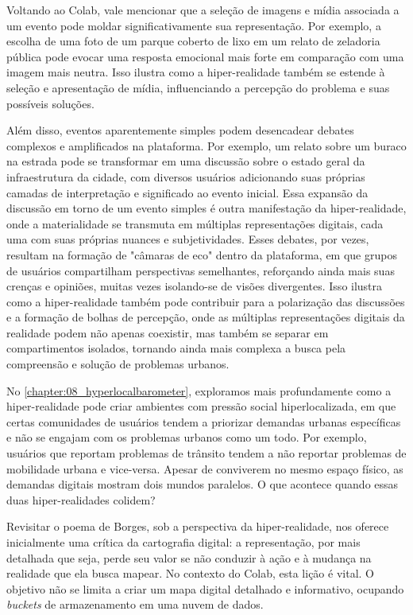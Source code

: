 Voltando ao Colab, vale mencionar que a seleção de imagens e mídia associada a um evento pode moldar significativamente sua representação. Por exemplo, a escolha de uma foto de um parque coberto de lixo em um relato de zeladoria pública pode evocar uma resposta emocional mais forte em comparação com uma imagem mais neutra. Isso ilustra como a hiper-realidade também se estende à seleção e apresentação de mídia, influenciando a percepção do problema e suas possíveis soluções.

Além disso, eventos aparentemente simples podem desencadear debates complexos e amplificados na plataforma. Por exemplo, um relato sobre um buraco na estrada pode se transformar em uma discussão sobre o estado geral da infraestrutura da cidade, com diversos usuários adicionando suas próprias camadas de interpretação e significado ao evento inicial. Essa expansão da discussão em torno de um evento simples é outra manifestação da hiper-realidade, onde a materialidade se transmuta em múltiplas representações digitais, cada uma com suas próprias nuances e subjetividades. Esses debates, por vezes, resultam na formação de "câmaras de eco" dentro da plataforma, em que grupos de usuários compartilham perspectivas semelhantes, reforçando ainda mais suas crenças e opiniões, muitas vezes isolando-se de visões divergentes. Isso ilustra como a hiper-realidade também pode contribuir para a polarização das discussões e a formação de bolhas de percepção, onde as múltiplas representações digitais da realidade podem não apenas coexistir, mas também se separar em compartimentos isolados, tornando ainda mais complexa a busca pela compreensão e solução de problemas urbanos.

No \autoref{chapter:08_hyperlocalbarometer}, exploramos mais profundamente como a hiper-realidade pode criar ambientes com pressão social hiperlocalizada, em que certas comunidades de usuários tendem a priorizar demandas urbanas específicas e não se engajam com os problemas urbanos como um todo. Por exemplo, usuários que reportam problemas de trânsito tendem a não reportar problemas de mobilidade urbana e vice-versa. Apesar de conviverem no mesmo espaço físico, as demandas digitais mostram dois mundos paralelos. O que acontece quando essas duas hiper-realidades colidem?

Revisitar o poema de Borges, sob a perspectiva da hiper-realidade, nos oferece inicialmente uma crítica da cartografia digital: a representação, por mais detalhada que seja, perde seu valor se não conduzir à ação e à mudança na realidade que ela busca mapear. No contexto do Colab, esta lição é vital. O objetivo não se limita a criar um mapa digital detalhado e informativo, ocupando \textit{buckets} de armazenamento em uma nuvem de dados.

